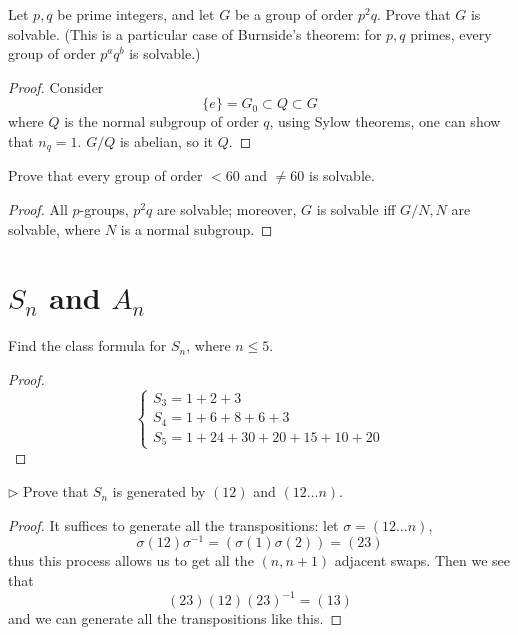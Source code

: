 \documentclass[openany]{book}
\begin{document}
\begin{prob}[3.15]
    Let $p, q$ be prime integers, and let $G$ be a group of order $p^2q$. Prove that $G$ is solvable. (This is a particular case of Burnside's theorem: for $p, q$ primes, every group of order $p^aq^b$ is solvable.)
\end{prob}
\begin{proof}
    Consider 
    \begin{equation*}
        \{e\}=G_0\subset Q\subset G
    \end{equation*}
    where $Q$ is the normal subgroup of order $q$, using Sylow theorems, one can show that $n_q=1$. $G/Q$ is abelian, so it $Q$. 
\end{proof}

\begin{prob}[3.16]
    Prove that every group of order $< 60$ and $\neq 60$ is solvable.
\end{prob}
\begin{proof}
    All $p$-groups, $p^2q$ are solvable; moreover, $G$ is solvable iff $G/N, N$ are solvable, where $N$ is a normal subgroup.
\end{proof}

\section{$S_n$ and $A_n$}
\begin{prob}[4.5]
    Find the class formula for $S_n$, where $n\leq 5$.
\end{prob}
\begin{proof}
    \begin{equation*}
        \begin{cases}
            S_3=1+2+3\\
            S_4=1+6+8+6+3\\
            S_5=1+24+30+20+15+10+20
        \end{cases}
    \end{equation*}
\end{proof}

\begin{prob}[4.7]
    $\triangleright$ Prove that $S_n$ is generated by $(12)$ and $(12\ldots n)$. 
    \end{prob}
\begin{proof}
    It suffices to generate all the transpositions: let $\sigma=(12\dots n)$, 
    \begin{equation*}
        \sigma(12)\sigma^{-1}=(\sigma(1)\sigma(2))=(23)
    \end{equation*}
    thus this process allows us to get all the $(n,n+1)$ adjacent swaps. Then we see that 
    \begin{equation*}
        (23)(12)(23)^{-1}=(13)
    \end{equation*}
    and we can generate all the transpositions like this.
\end{proof}
    
\end{document}
